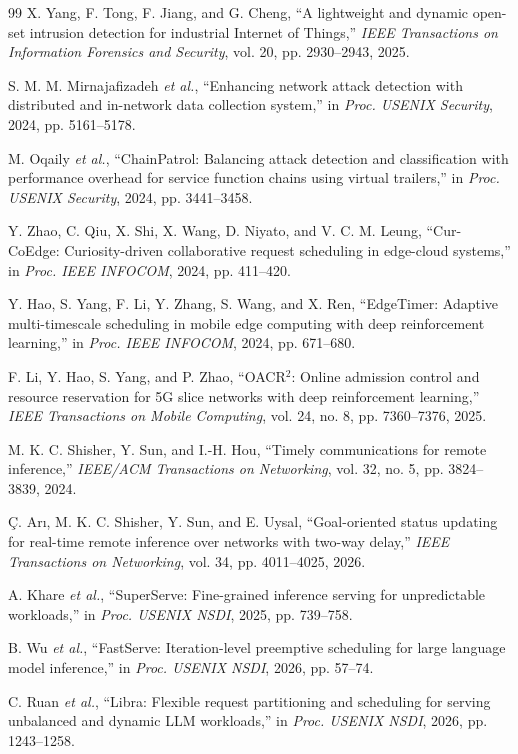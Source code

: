 \documentclass[10pt,journal]{IEEEtran}
\begin{document}
\begin{thebibliography}{99}
X. Yang, F. Tong, F. Jiang, and G. Cheng,
``A lightweight and dynamic open-set intrusion detection for industrial
Internet of Things,''
\emph{IEEE Transactions on Information Forensics and Security},
vol. 20, pp. 2930--2943, 2025.

S. M. M. Mirnajafizadeh \emph{et al.},
``Enhancing network attack detection with distributed and in-network
data collection system,''
in \emph{Proc. USENIX Security}, 2024, pp. 5161--5178.

M. Oqaily \emph{et al.},
``ChainPatrol: Balancing attack detection and classification with
performance overhead for service function chains using virtual trailers,''
in \emph{Proc. USENIX Security}, 2024, pp. 3441--3458.

Y. Zhao, C. Qiu, X. Shi, X. Wang, D. Niyato, and V. C. M. Leung,
``Cur-CoEdge: Curiosity-driven collaborative request scheduling in
edge-cloud systems,''
in \emph{Proc. IEEE INFOCOM}, 2024, pp. 411--420.

Y. Hao, S. Yang, F. Li, Y. Zhang, S. Wang, and X. Ren,
``EdgeTimer: Adaptive multi-timescale scheduling in mobile edge computing
with deep reinforcement learning,''
in \emph{Proc. IEEE INFOCOM}, 2024, pp. 671--680.

F. Li, Y. Hao, S. Yang, and P. Zhao,
``OACR$^2$: Online admission control and resource reservation for 5G
slice networks with deep reinforcement learning,''
\emph{IEEE Transactions on Mobile Computing},
vol. 24, no. 8, pp. 7360--7376, 2025.

M. K. C. Shisher, Y. Sun, and I.-H. Hou,
``Timely communications for remote inference,''
\emph{IEEE/ACM Transactions on Networking},
vol. 32, no. 5, pp. 3824--3839, 2024.

\c{C}. Ar{\i}, M. K. C. Shisher, Y. Sun, and E. Uysal,
``Goal-oriented status updating for real-time remote inference over
networks with two-way delay,''
\emph{IEEE Transactions on Networking},
vol. 34, pp. 4011--4025, 2026.

A. Khare \emph{et al.},
``SuperServe: Fine-grained inference serving for unpredictable workloads,''
in \emph{Proc. USENIX NSDI}, 2025, pp. 739--758.

B. Wu \emph{et al.},
``FastServe: Iteration-level preemptive scheduling for large language
model inference,''
in \emph{Proc. USENIX NSDI}, 2026, pp. 57--74.

C. Ruan \emph{et al.},
``Libra: Flexible request partitioning and scheduling for serving
unbalanced and dynamic LLM workloads,''
in \emph{Proc. USENIX NSDI}, 2026, pp. 1243--1258.

\end{thebibliography}
\end{document}
